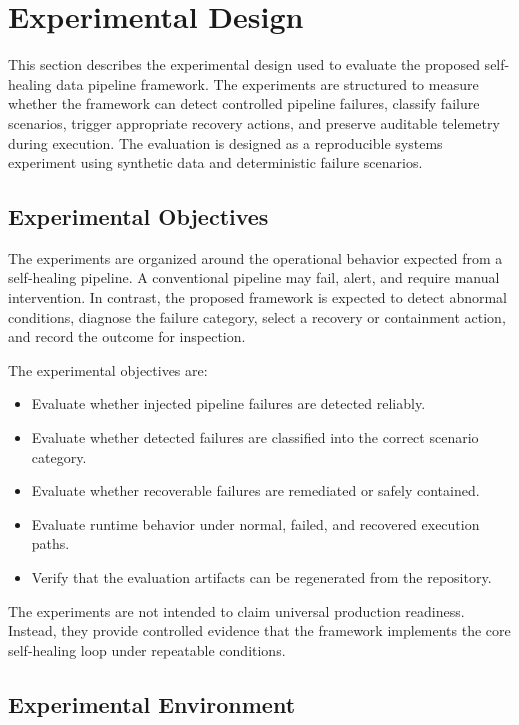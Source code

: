 \section{Experimental Design}
\label{sec:experiments}

This section describes the experimental design used to evaluate the proposed self-healing data pipeline framework. The experiments are structured to measure whether the framework can detect controlled pipeline failures, classify failure scenarios, trigger appropriate recovery actions, and preserve auditable telemetry during execution. The evaluation is designed as a reproducible systems experiment using synthetic data and deterministic failure scenarios.

\subsection{Experimental Objectives}

The experiments are organized around the operational behavior expected from a self-healing pipeline. A conventional pipeline may fail, alert, and require manual intervention. In contrast, the proposed framework is expected to detect abnormal conditions, diagnose the failure category, select a recovery or containment action, and record the outcome for inspection.

The experimental objectives are:

\begin{itemize}
    \item Evaluate whether injected pipeline failures are detected reliably.
    \item Evaluate whether detected failures are classified into the correct scenario category.
    \item Evaluate whether recoverable failures are remediated or safely contained.
    \item Evaluate runtime behavior under normal, failed, and recovered execution paths.
    \item Verify that the evaluation artifacts can be regenerated from the repository.
\end{itemize}

The experiments are not intended to claim universal production readiness. Instead, they provide controlled evidence that the framework implements the core self-healing loop under repeatable conditions.

\subsection{Experimental Environment}

